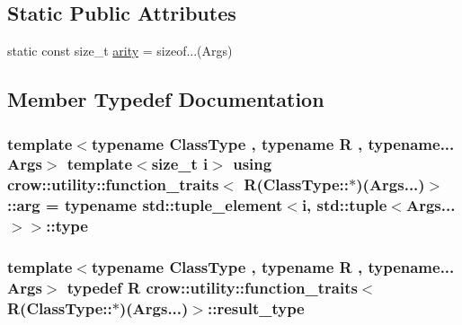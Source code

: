 \subsection*{Static Public Attributes}
\begin{DoxyCompactItemize}
\item 
static const size\-\_\-t \hyperlink{structcrow_1_1utility_1_1function__traits_3_01_r_07_class_type_1_1_5_08_07_args_8_8_8_08_4_a70e049ee588a28d26a3745233cae15f7}{arity} = sizeof...(Args)
\end{DoxyCompactItemize}


\subsection{Member Typedef Documentation}
\hypertarget{structcrow_1_1utility_1_1function__traits_3_01_r_07_class_type_1_1_5_08_07_args_8_8_8_08_4_a0e8df3bac34af430f11227978ee13100}{
\subsubsection[{arg}]{\setlength{\rightskip}{0pt plus 5cm}template$<$typename Class\-Type , typename R , typename... Args$>$ template$<$size\-\_\-t i$>$ using {\bf crow\-::utility\-::function\-\_\-traits}$<$ R(Class\-Type\-::$\ast$)(Args...)$>$\-::{\bf arg} =  typename std\-::tuple\-\_\-element$<$i, std\-::tuple$<$Args...$>$$>$\-::type}}\label{structcrow_1_1utility_1_1function__traits_3_01_r_07_class_type_1_1_5_08_07_args_8_8_8_08_4_a0e8df3bac34af430f11227978ee13100}
\hypertarget{structcrow_1_1utility_1_1function__traits_3_01_r_07_class_type_1_1_5_08_07_args_8_8_8_08_4_a251e619f348901cbe3a218f6b9441dd7}{
\subsubsection[{result\-\_\-type}]{\setlength{\rightskip}{0pt plus 5cm}template$<$typename Class\-Type , typename R , typename... Args$>$ typedef R {\bf crow\-::utility\-::function\-\_\-traits}$<$ R(Class\-Type\-::$\ast$)(Args...)$>$\-::{\bf result\-\_\-type}}}\label{structcrow_1_1utility_1_1function__traits_3_01_r_07_class_type_1_1_5_08_07_args_8_8_8_08_4_a251e619f348901cbe3a218f6b9441dd7}


